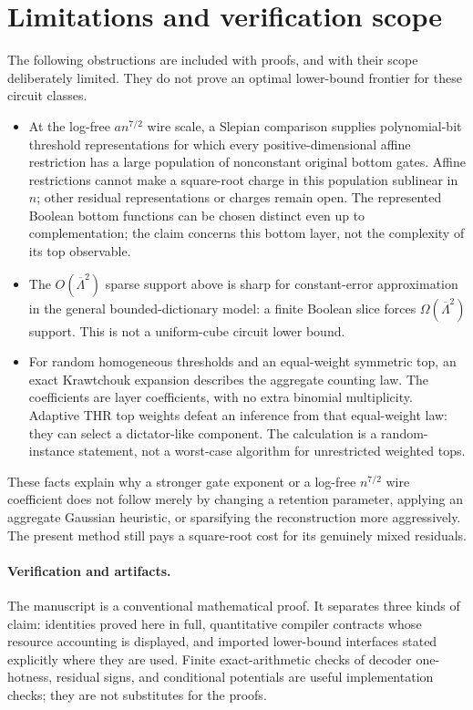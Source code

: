\documentclass[11pt,letterpaper]{article}
\theoremstyle{definition}
\theoremstyle{remark}
\begin{document}
\section{Limitations and verification scope}
\label{sec:limitations-main}

The following obstructions are included with proofs, and with their
scope deliberately limited. They do not prove an optimal lower-bound
frontier for these circuit classes.

\begin{itemize}
\item At the log-free $a n^{7/2}$ wire scale, a Slepian comparison
supplies polynomial-bit threshold representations for which every
positive-dimensional affine restriction has a large population of
nonconstant original bottom gates. Affine restrictions cannot make a
square-root charge in this population sublinear in $n$; other residual
representations or charges remain open. The represented Boolean bottom
functions can be chosen distinct even up to complementation; the claim
concerns this bottom layer, not the complexity of its top observable.
\item The $O(\overline\Lambda^2)$ sparse support above is sharp for
constant-error approximation in the general bounded-dictionary model:
a finite Boolean slice forces $\Omega(\overline\Lambda^2)$ support.
This is not a uniform-cube circuit lower bound.
\item For random homogeneous thresholds and an equal-weight
symmetric top, an exact Krawtchouk expansion describes the aggregate
counting law. The coefficients are layer coefficients, with no extra
binomial multiplicity. Adaptive THR top weights defeat an inference
from that equal-weight law: they can select a dictator-like component.
The calculation is a random-instance statement, not a worst-case
algorithm for unrestricted weighted tops.
\end{itemize}

These facts explain why a stronger gate exponent or a log-free
$n^{7/2}$ wire coefficient does not follow merely by changing a
retention parameter, applying an aggregate Gaussian heuristic, or
sparsifying the reconstruction more aggressively. The present method
still pays a square-root cost for its genuinely mixed residuals.

\paragraph{Verification and artifacts.}
The manuscript is a conventional mathematical proof. It separates
three kinds of claim: identities proved here in full, quantitative
compiler contracts whose resource accounting is displayed, and
imported lower-bound interfaces stated explicitly where they are
used. Finite exact-arithmetic checks of
decoder one-hotness, residual signs, and conditional potentials are
useful implementation checks; they are not substitutes for the proofs.
\end{document}

